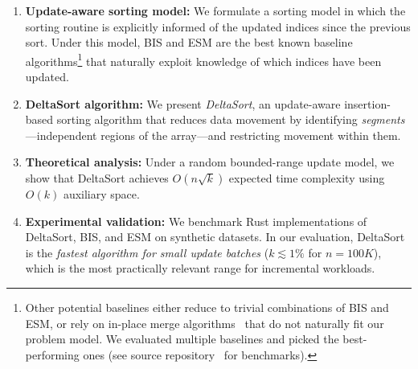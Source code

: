\begin{enumerate}
  \item \textbf{Update-aware sorting model:} We formulate a sorting model in which the sorting routine is explicitly informed of the updated indices since the previous sort. Under this model, BIS and ESM are the best known baseline algorithms\footnote{Other potential baselines either reduce to trivial combinations of BIS and ESM, or rely on in-place merge algorithms~\cite{kronrod1969optimal} that do not naturally fit our problem model. We evaluated multiple baselines and picked the best-performing ones (see source repository~\cite{deltasort-repo} for benchmarks).} that naturally exploit knowledge of which indices have been updated.

  \item \textbf{DeltaSort algorithm:} We present \emph{DeltaSort}, an update-aware insertion-based sorting algorithm that reduces data movement by identifying \emph{segments}—independent regions of the array—and restricting movement within them.
  
  \item \textbf{Theoretical analysis:} Under a random bounded-range update model, we show that DeltaSort achieves $O(n\sqrt{k})$ expected time complexity using $O(k)$ auxiliary space.
  
  \item \textbf{Experimental validation:} We benchmark Rust implementations of DeltaSort, BIS, and ESM on synthetic datasets. In our evaluation, DeltaSort is the \emph{fastest algorithm for small update batches} ($k \lesssim 1\%$ for $n=100K$), which is the most practically relevant range for incremental workloads.
\end{enumerate}


